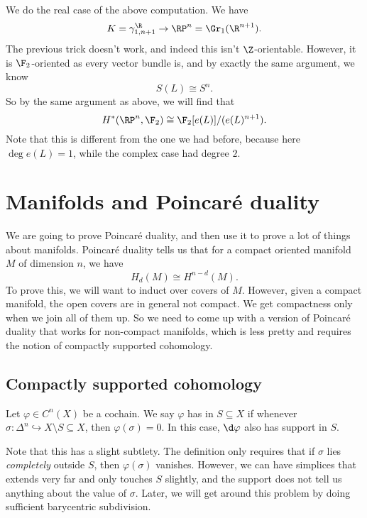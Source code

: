 \documentclass[a4paper]{article}
\begin{document}
\begin{eg}
  We do the real case of the above computation. We have
  \[
    K = \gamma_{1, n + 1}^\R \to \RP^n = \Gr_1(\R^{n + 1}).
  \]
  The previous trick doesn't work, and indeed this isn't $\Z$-orientable. However, it is $\F_2$-oriented as every vector bundle is, and by exactly the same argument, we know
  \[
    S(L) \cong S^n.
  \]
  So by the same argument as above, we will find that
  \[
    H^*(\RP^n, \F_2) \cong \F_2[e(L)]/(e(L)^{n + 1}).
  \]
  Note that this is different from the one we had before, because here $\deg e(L) = 1$, while the complex case had degree $2$.
\end{eg}

\section{Manifolds and \texorpdfstring{Poincar\'e}{Poincare} duality}
We are going to prove Poincar\'e duality, and then use it to prove a lot of things about manifolds. Poincar\'e duality tells us that for a compact oriented manifold $M$ of dimension $n$, we have
\[
  H_d(M) \cong H^{n - d}(M).
\]
To prove this, we will want to induct over covers of $M$. However, given a compact manifold, the open covers are in general not compact. We get compactness only when we join all of them up. So we need to come up with a version of Poincar\'e duality that works for non-compact manifolds, which is less pretty and requires the notion of compactly supported cohomology.

\subsection{Compactly supported cohomology}

\begin{defi}
  Let $\varphi \in C^n(X)$ be a cochain. We say $\varphi$ has  in $S \subseteq X$ if whenever $\sigma: \Delta^n \hookrightarrow X \setminus S \subseteq X$, then $\varphi(\sigma) = 0$. In this case, $\d \varphi$ also has support in $S$.
\end{defi}
Note that this has a slight subtlety. The definition only requires that if $\sigma$ lies \emph{completely} outside $S$, then $\varphi(\sigma)$ vanishes. However, we can have simplices that extends very far and only touches $S$ slightly, and the support does not tell us anything about the value of $\sigma$. Later, we will get around this problem by doing sufficient barycentric subdivision.
\end{document}
